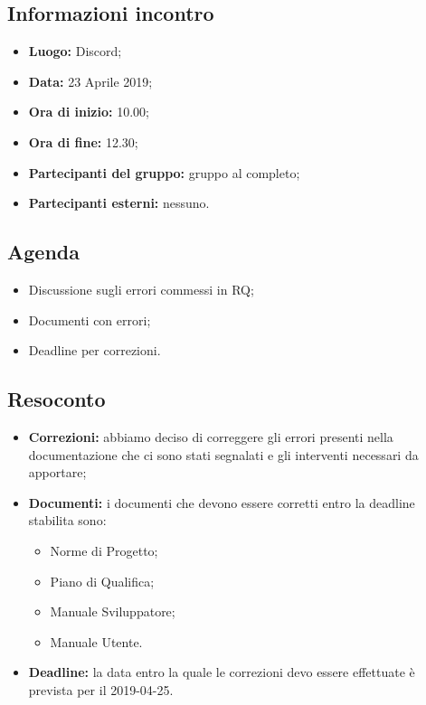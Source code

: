 \subsection{Informazioni incontro}
\begin{itemize}
	\item { \textbf{Luogo:} Discord};
	\item { \textbf{Data:} 23 Aprile 2019};
	\item { \textbf{Ora di inizio:} 10.00};
	\item { \textbf{Ora di fine:} 12.30};
	\item { \textbf{Partecipanti del gruppo:} gruppo al completo};
	\item { \textbf{Partecipanti esterni:} nessuno}.
\end{itemize}


\subsection{Agenda}
\begin{itemize}
	\item {Discussione sugli errori commessi in RQ;}
	\item {Documenti con errori;}
	\item {Deadline per correzioni.}
\end{itemize}

\subsection{Resoconto}
\begin{itemize}
	\item { \textbf{Correzioni:} abbiamo deciso di correggere gli errori presenti nella documentazione che ci sono stati segnalati e gli interventi necessari da apportare;}
	\item{ \textbf{Documenti:} i documenti che devono essere corretti entro la deadline stabilita sono:
		\begin{itemize}
			\item Norme di Progetto;
			\item Piano di Qualifica;
			\item Manuale Sviluppatore;
			\item Manuale Utente.
		\end{itemize}}
	\item {\textbf{Deadline:} la data entro la quale le correzioni devo essere effettuate è prevista per il 2019-04-25.}
\end{itemize}

